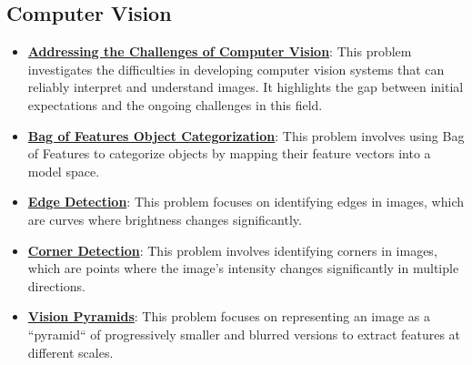 \documentclass{article}%
\begin{document}
%
\subsection{Computer Vision}%
\label{subsec:ComputerVision}%
\begin{itemize}[leftmargin=*]%
\item \href{https://purdue.brightspace.com/d2l/common/assets/pdfjs-d2l-dist/1.0.14-legacy/web/viewer.html?file=\%2Fcontent\%2Fenforced\%2F1095467-wl.202510.CS.24300.001\%2F02L2-Intro.pdf\%3Fou\%3D1095467\&lang=en-us\&container=d2l-fileviewer-rendered-pdf\&fullscreen=d2l-fileviewer-rendered-pdf-dialog\&height=667#page=15}{\textbf{Addressing the Challenges of Computer Vision}}: This problem investigates the difficulties in developing computer vision systems that can reliably interpret and understand images. It highlights the gap between initial expectations and the ongoing challenges in this field.%
\item \href{https://purdue.brightspace.com/d2l/common/assets/pdfjs-d2l-dist/1.0.14-legacy/web/viewer.html?file=\%2Fcontent\%2Fenforced\%2F1095467-wl.202510.CS.24300.001\%2F08L2-Feature Extraction.pdf\%3Fou\%3D1095467\&lang=en-us\&container=d2l-fileviewer-rendered-pdf\&fullscreen=d2l-fileviewer-rendered-pdf-dialog\&height=667#page=3}{\textbf{Bag of Features Object Categorization}}: This problem involves using Bag of Features to categorize objects by mapping their feature vectors into a model space.%
\item \href{https://purdue.brightspace.com/d2l/common/assets/pdfjs-d2l-dist/1.0.14-legacy/web/viewer.html?file=\%2Fcontent\%2Fenforced\%2F1095467-wl.202510.CS.24300.001\%2F08L2-Feature Extraction.pdf\%3Fou\%3D1095467\&lang=en-us\&container=d2l-fileviewer-rendered-pdf\&fullscreen=d2l-fileviewer-rendered-pdf-dialog\&height=667#page=4}{\textbf{Edge Detection}}: This problem focuses on identifying edges in images, which are curves where brightness changes significantly.%
\item \href{https://purdue.brightspace.com/d2l/common/assets/pdfjs-d2l-dist/1.0.14-legacy/web/viewer.html?file=\%2Fcontent\%2Fenforced\%2F1095467-wl.202510.CS.24300.001\%2F08L2-Feature Extraction.pdf\%3Fou\%3D1095467\&lang=en-us\&container=d2l-fileviewer-rendered-pdf\&fullscreen=d2l-fileviewer-rendered-pdf-dialog\&height=667#page=20}{\textbf{Corner Detection}}: This problem involves identifying corners in images, which are points where the image's intensity changes significantly in multiple directions.%
\item \href{https://purdue.brightspace.com/d2l/common/assets/pdfjs-d2l-dist/1.0.14-legacy/web/viewer.html?file=\%2Fcontent\%2Fenforced\%2F1095467-wl.202510.CS.24300.001\%2F08L2-Feature Extraction.pdf\%3Fou\%3D1095467\&lang=en-us\&container=d2l-fileviewer-rendered-pdf\&fullscreen=d2l-fileviewer-rendered-pdf-dialog\&height=667#page=30}{\textbf{Vision Pyramids}}: This problem focuses on representing an image as a ``pyramid`` of progressively smaller and blurred versions to extract features at different scales.%

\end{itemize}
\end{document}
